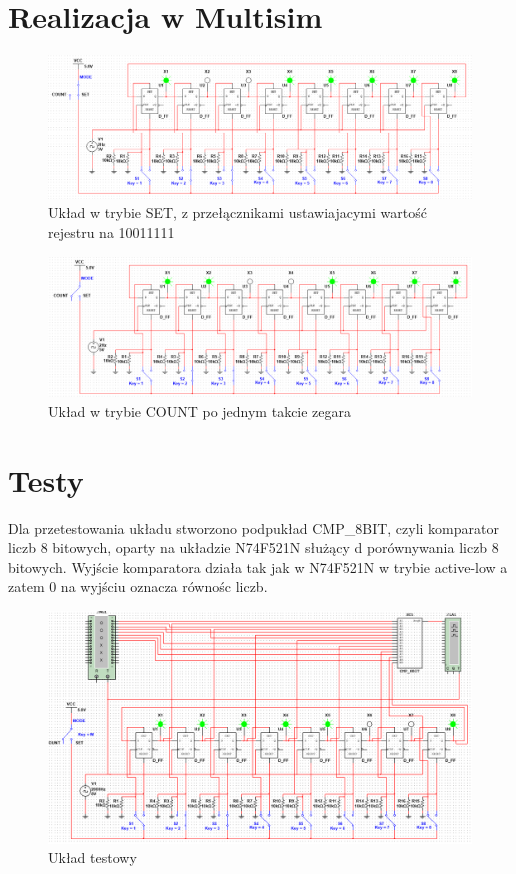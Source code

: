 \documentclass[12pt,a4paper,openright]{mwrep}
\begin{document}
\section{Realizacja w Multisim}

\begin{figure}[H]
    \centering
    \includegraphics[width=1\textwidth]{images/2b_set_example.png}
    \caption{Układ w trybie SET, z przełącznikami ustawiajacymi wartość rejestru na 10011111}
    \label{rys:2b_set_example}
\end{figure}

\begin{figure}[H]
    \centering
    \includegraphics[width=1\textwidth]{images/2b_count_tick1_example.png}
    \caption{Układ w trybie COUNT po jednym takcie zegara}
    \label{rys:2b_count_tick1_example}
\end{figure}

\section{Testy}


Dla przetestowania układu stworzono podpukład CMP\_8BIT, czyli komparator liczb 8 bitowych, 
oparty na układzie N74F521N służący d porównywania liczb 8 bitowych.
Wyjście komparatora działa tak jak w N74F521N w trybie active-low a zatem 0 na wyjściu
oznacza równośc liczb.

\begin{figure}[H]
    \centering
    \includegraphics[width=1\textwidth]{images/2b_test_cir.png}
    \caption{Układ testowy}
    \label{rys:2b_test_cir}
\end{figure}
\end{document}
